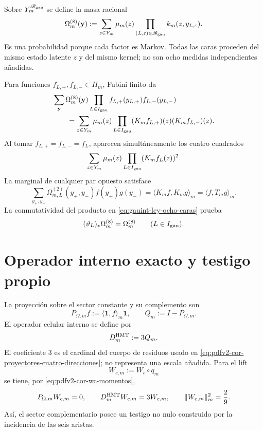 Sobre \(Y_m^{\mathscr B_{\rm gau}}\) se define la masa racional
\begin{equation}\label{eq:gauint-ley-ocho-caras}
 \Omega_m^{(8)}(\mathbf y)
 :=\sum_{z\in Y_m}\mu_m(z)
 \prod_{(L,\varepsilon)\in\mathscr B_{\rm gau}}
 k_m(z,y_{L,\varepsilon}).
\end{equation}
Es una probabilidad porque cada factor es Markov. Todas las caras proceden
del mismo estado latente \(z\) y del mismo kernel; no son ocho medidas
independientes añadidas.

Para funciones \(f_{L,+},f_{L,-}\in H_m\), Fubini finito da
\begin{equation}\label{eq:gauint-fubini-ocho}
\begin{aligned}
 &\sum_{\mathbf y}\Omega_m^{(8)}(\mathbf y)
  \prod_{L\in I_{\rm gau}}
  f_{L,+}(y_{L,+})f_{L,-}(y_{L,-})\\
 &\qquad=
 \sum_{z\in Y_m}\mu_m(z)
 \prod_{L\in I_{\rm gau}}
 (K_mf_{L,+})(z)(K_mf_{L,-})(z).
\end{aligned}
\end{equation}
Al tomar \(f_{L,+}=f_{L,-}=f_L\), aparecen simultáneamente los cuatro
cuadrados
\begin{equation}\label{eq:gauint-cuatro-cuadrados}
 \sum_{z\in Y_m}\mu_m(z)
 \prod_{L\in I_{\rm gau}}(K_mf_L(z))^2.
\end{equation}
La marginal de cualquier par opuesto satisface
\begin{equation}\label{eq:gauint-marginal-t}
 \sum_{y_+,y_-}\Omega_{m,L}^{(2)}(y_+,y_-)
 f(y_+)g(y_-)
 =\langle K_mf,K_mg\rangle_m
 =\langle f,T_mg\rangle_m.
\end{equation}
La conmutatividad del producto en \eqref{eq:gauint-ley-ocho-caras} prueba
\begin{equation}\label{eq:gauint-involuciones-ley}
 (\vartheta_L)_*\Omega_m^{(8)}=\Omega_m^{(8)}
 \qquad(L\in I_{\rm gau}).
\end{equation}

\section{Operador interno exacto y testigo propio}

La proyección sobre el sector constante y su complemento son
\begin{equation}\label{eq:gauint-pq}
 P_{\Omega,m}f:=\langle\mathbf1,f\rangle_m\mathbf1,
 \qquad
 Q_m:=I-P_{\Omega,m}.
\end{equation}
El operador celular interno se define por
\begin{equation}\label{eq:gauint-d-hmt}
 D_m^{\rm HMT}:=3Q_m.
\end{equation}
El coeficiente \(3\) es el cardinal del cuerpo de residuos usado en
\eqref{eq:pdfv2-cor-proyectores-cuatro-direcciones}; no representa una
escala añadida.
Para el lift
\[
 W_{c,m}:=W_c\circ q_m
\]
se tiene, por \eqref{eq:pdfv2-cor-wc-momentos},
\begin{equation}\label{eq:gauint-w-eigen}
 P_{\Omega,m}W_{c,m}=0,
 \qquad
 D_m^{\rm HMT}W_{c,m}=3W_{c,m},
 \qquad
 \|W_{c,m}\|_m^2=\frac29.
\end{equation}
Así, el sector complementario posee un testigo no nulo construido por la
incidencia de las seis aristas.

